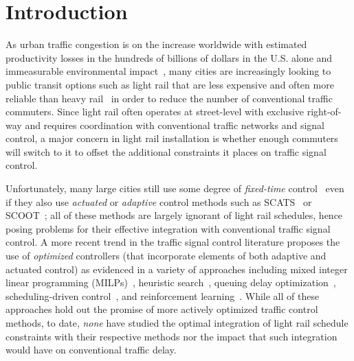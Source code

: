 \section{Introduction}

As urban traffic congestion is on the increase worldwide with
estimated productivity losses in the hundreds of billions of dollars
in the U.S. alone and immeasurable environmental
impact~\cite{bazzan2013intro}, many cities are increasingly looking to
public transit options such as light rail that are less expensive
and often more reliable than heavy rail~\cite{thompson2003lightrail}
in order to reduce the number of conventional traffic commuters.
Since light rail often operates at street-level with exclusive
right-of-way and requires coordination with conventional traffic
networks and signal control, a major concern in light rail
installation is whether enough commuters will switch to it to offset
the additional constraints it places on traffic signal control.


Unfortunately, many large cities still use some degree of
\emph{fixed-time} control~ even if they
also use \emph{actuated} or \emph{adaptive} control methods such as
SCATS~ or SCOOT~; all of these
methods are largely ignorant of light rail schedules, hence posing
problems for their effective integration with conventional traffic
signal control.  A more recent trend in the traffic signal control
literature proposes the use of \emph{optimized} controllers (that
incorporate elements of both adaptive and actuated control) as
evidenced in a variety of approaches including mixed integer linear
programming
(MILPs)~,
heuristic search~, queuing
delay optimization~,
scheduling-driven
control~, and
reinforcement learning~.  While all of
these approaches hold out the promise of more actively optimized
traffic control methods, to date, \emph{none} have studied the 
optimal integration of light rail schedule constraints with their
respective methods nor the impact that such integration would have on
conventional traffic delay.


